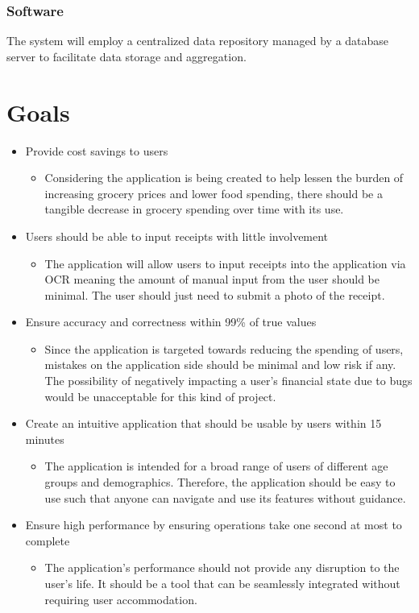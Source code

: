\documentclass{article}
\begin{document}
\subsubsection{Software}
The system will employ a centralized data repository managed by a database server to facilitate data storage and aggregation.

\section{Goals}

\begin{itemize}
  \item Provide cost savings to users
  \begin{itemize}
    \item Considering the application is being created to help lessen the burden of increasing
    grocery prices and lower food spending, there should be a tangible decrease in grocery spending
    over time with its use.
  \end{itemize}
  \item Users should be able to input receipts with little involvement
  \begin{itemize}
    \item The application will allow users to input receipts into the application via OCR
    meaning the amount of manual input from the user should be minimal. The user should just need
    to submit a photo of the receipt.
  \end{itemize}
  \item Ensure accuracy and correctness within 99\% of true values
  \begin{itemize}
    \item Since the application is targeted towards reducing the spending of users, mistakes
    on the application side should be minimal and low risk if any. The possibility of negatively
    impacting a user's financial state due to bugs would be unacceptable for this kind of
    project.
  \end{itemize}  
  \item Create an intuitive application that should be usable by users within 15 minutes
  \begin{itemize}
    \item The application is intended for a broad range of users of different age groups
    and demographics. Therefore, the application should be easy to use such that anyone
    can navigate and use its features without guidance.
  \end{itemize}  
  \item Ensure high performance by ensuring operations take one second at most to complete
  \begin{itemize}
    \item The application's performance should not provide any disruption to the user's life.
    It should be a tool that  can be seamlessly integrated without requiring user
    accommodation.
  \end{itemize} 
\end{itemize}
\end{document}
